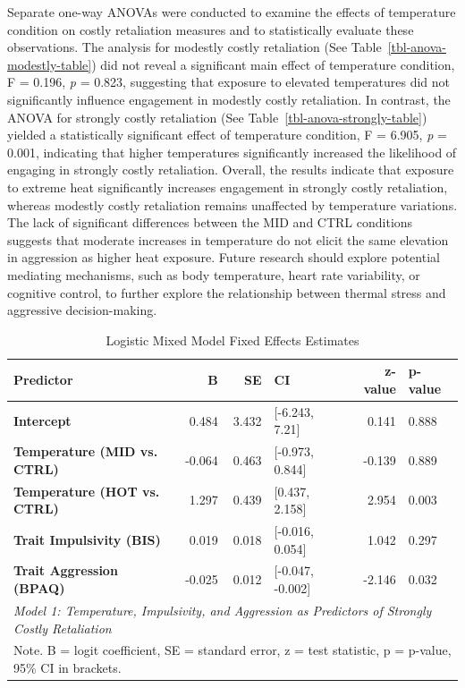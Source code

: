 \documentclass[
  man,
  floatsintext,
  longtable,
  nolmodern,
  notxfonts,
  notimes,
  colorlinks=true,linkcolor=blue,citecolor=blue,urlcolor=blue]{apa7}
\begin{document}
Separate one-way ANOVAs were conducted to examine the effects of
temperature condition on costly retaliation measures and to
statistically evaluate these observations. The analysis for modestly
costly retaliation (See Table~\ref{tbl-anova-modestly-table}) did not
reveal a significant main effect of temperature condition, F = 0.196,
\emph{p} = 0.823, suggesting that exposure to elevated temperatures did
not significantly influence engagement in modestly costly retaliation.
In contrast, the ANOVA for strongly costly retaliation (See
Table~\ref{tbl-anova-strongly-table}) yielded a statistically
significant effect of temperature condition, F = 6.905, \emph{p} =
0.001, indicating that higher temperatures significantly increased the
likelihood of engaging in strongly costly retaliation. Overall, the
results indicate that exposure to extreme heat significantly increases
engagement in strongly costly retaliation, whereas modestly costly
retaliation remains unaffected by temperature variations. The lack of
significant differences between the MID and CTRL conditions suggests
that moderate increases in temperature do not elicit the same elevation
in aggression as higher heat exposure. Future research should explore
potential mediating mechanisms, such as body temperature, heart rate
variability, or cognitive control, to further explore the relationship
between thermal stress and aggressive decision-making.

\begin{table}

{\caption{{Logistic Mixed Model Fixed Effects
Estimates}{\label{tbl-logit-table}}}
\vspace{-20pt}}

\centering
\begin{tabular}[t]{>{}lrrlrl}
\toprule
Predictor & B & SE & CI & z-value & p-value\\
\midrule
\textbf{Intercept} & 0.484 & 3.432 & {}[-6.243, 7.21] & 0.141 & 0.888\\
\textbf{Temperature (MID vs. CTRL)} & -0.064 & 0.463 & {}[-0.973, 0.844] & -0.139 & 0.889\\
\textbf{Temperature (HOT vs. CTRL)} & 1.297 & 0.439 & {}[0.437, 2.158] & 2.954 & 0.003\\
\textbf{Trait Impulsivity (BIS)} & 0.019 & 0.018 & {}[-0.016, 0.054] & 1.042 & 0.297\\
\textbf{Trait Aggression (BPAQ)} & -0.025 & 0.012 & {}[-0.047, -0.002] & -2.146 & 0.032\\
\bottomrule
\multicolumn{6}{l}{\rule{0pt}{1em}\textit{Model 1: Temperature, Impulsivity, and Aggression as Predictors of Strongly Costly Retaliation}}\\
\multicolumn{6}{l}{\rule{0pt}{1em}Note. B = logit coefficient, SE = standard error, z = test statistic, p = p-value, 95\% CI in brackets.}\\
\end{tabular}

\end{table}
\end{document}
